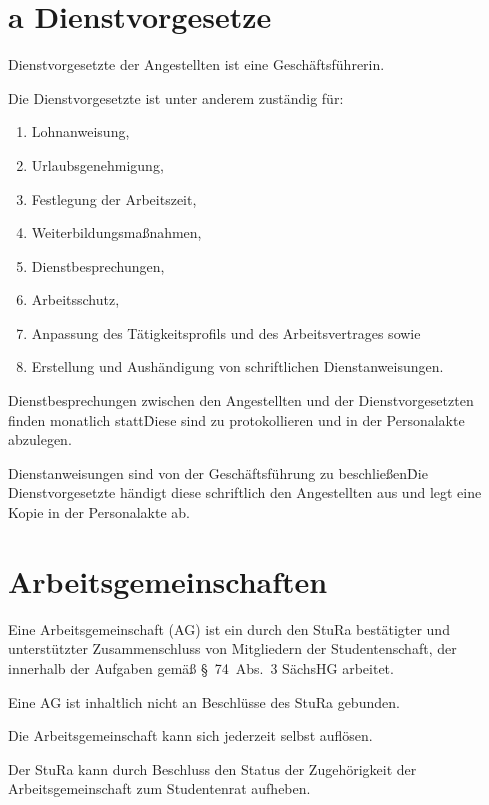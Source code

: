 \begin{multicols}{2}
\setcounter{section}{26}
\section{a Dienstvorgesetze}

\Abs \Satz Dienstvorgesetzte der Angestellten ist eine Geschäftsführerin.

\Abs \Satz Die Dienstvorgesetzte ist unter anderem zuständig für:
\begin{enumerate}
\item Lohnanweisung,
\item Urlaubsgenehmigung,
\item Festlegung der Arbeitszeit,
\item Weiterbildungsmaßnahmen,
\item Dienstbesprechungen,
\item Arbeitsschutz,
\item Anpassung des Tätigkeitsprofils und des Arbeitsvertrages sowie
\item Erstellung und Aushändigung von schriftlichen Dienstanweisungen.
\end{enumerate}

\Abs \Satz Dienstbesprechungen zwischen den Angestellten und der Dienstvorgesetzten finden monatlich statt\. Diese sind zu protokollieren und in der Personalakte abzulegen.

\Abs \Satz Dienstanweisungen sind von der Geschäftsführung zu beschließen\. Die Dienstvorgesetzte händigt diese schriftlich den Angestellten aus und legt eine Kopie in der Personalakte ab.

\setcounter{section}{27}



\section{Arbeitsgemeinschaften} %

\Abs \Satz Eine Arbeitsgemeinschaft (AG) ist ein durch den StuRa bestätigter und unterstützter Zusammenschluss von Mitgliedern der Studentenschaft, der innerhalb der Aufgaben gemäß §~74~Abs.~3 SächsHG arbeitet.

\Abs \Satz Eine AG ist inhaltlich nicht an Beschlüsse des StuRa gebunden.

\Abs \Satz Die Arbeitsgemeinschaft kann sich jederzeit selbst auflösen.

\Abs \Satz Der StuRa kann durch Beschluss den Status der Zugehörigkeit der Arbeitsgemeinschaft zum Studentenrat aufheben.


\end{multicols}
